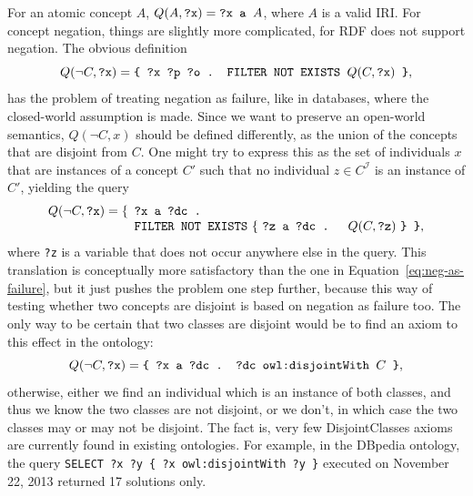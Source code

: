 \documentclass{llncs}
\begin{document}
For an atomic concept $A$, $Q(A, \mbox{\tt ?x}) = \mbox{\tt ?x a }A$,
where $A$ is a valid IRI.
For concept negation, things are slightly more complicated, for RDF does not support
negation.
The obvious definition
\begin{equation}\label{eq:neg-as-failure}
  Q(\neg C, \mbox{\tt ?x}) =
    \mbox{\tt \{ ?x ?p ?o . FILTER NOT EXISTS } Q(C, \mbox{\tt ?x}) \mbox{\tt\ \}},
\end{equation}
has the problem of treating negation as failure, like in databases,
where the closed-world assumption is made. 
Since we want to preserve an open-world semantics, $Q(\neg C, x)$ should be defined
differently, as the union of the concepts that are disjoint from $C$.
One might try to express this as the set of individuals $x$ that are instances of a
concept $C'$ such that no individual $z\in C^\mathcal{I}$ is an instance of $C'$,
yielding the query
\begin{equation}\label{eq:approx-open-world-negation}
  Q(\neg C, \mbox{\tt ?x}) =
  \begin{minipage}[t]{5in}
    \begin{tabbing}
      \quad\=\quad\=\quad\=\kill
      \{\>\texttt{?x a ?dc .}\\
        \>\texttt{FILTER NOT EXISTS} \{ \texttt{?z a ?dc . } $Q(C, \mbox{\tt ?z})$ \texttt{\} \}},
    \end{tabbing}
  \end{minipage}
\end{equation}
where \texttt{?z} is a variable that does not occur anywhere else in the query.
This translation is conceptually more satisfactory than the one in Equation~\ref{eq:neg-as-failure},
but it just pushes the problem one step further, because this way of testing whether
two concepts are disjoint is based on negation as failure too.
The only way to be certain that two classes are disjoint would be to find an axiom to
this effect in the ontology:
\begin{equation}\label{eq:negation-with-disjointWith}
  Q(\neg C, \mbox{\tt ?x}) =
    \mbox{\tt \{ ?x a ?dc . ?dc owl:disjointWith }
    C \mbox{\tt\ \}},
\end{equation}
otherwise, either we find an individual which is an instance of both classes,
and thus we know the two classes are not disjoint, or we don't,
in which case the two classes may or may not be disjoint.
The fact is, very few \textsf{DisjointClasses} axioms are currently found in existing
ontologies. For example, in the DBpedia ontology, the query
\texttt{SELECT ?x ?y \{ ?x owl:disjointWith ?y \}} executed on November 22, 2013
returned 17 solutions only.
\end{document}
